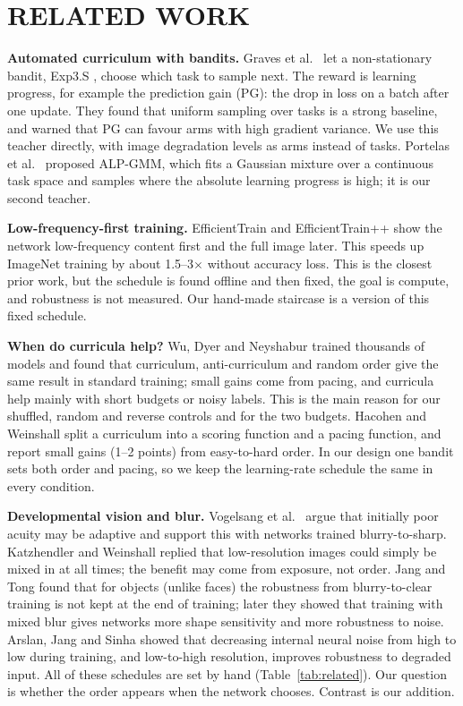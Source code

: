 \documentclass[a4paper,12pt]{report}
\begin{document}
\chapter{RELATED WORK}

\textbf{Automated curriculum with bandits.} Graves et al.\ \cite{graves2017} let a non-stationary bandit, Exp3.S \cite{auer2002}, choose which task to sample next. The reward is learning progress, for example the prediction gain (PG): the drop in loss on a batch after one update. They found that uniform sampling over tasks is a strong baseline, and warned that PG can favour arms with high gradient variance. We use this teacher directly, with image degradation levels as arms instead of tasks. Portelas et al.\ \cite{portelas2019} proposed ALP-GMM, which fits a Gaussian mixture over a continuous task space and samples where the absolute learning progress is high; it is our second teacher.

\textbf{Low-frequency-first training.} EfficientTrain \cite{wang2023efficienttrain} and EfficientTrain++ \cite{wang2024efficienttrainpp} show the network low-frequency content first and the full image later. This speeds up ImageNet training by about 1.5--3$\times$ without accuracy loss. This is the closest prior work, but the schedule is found offline and then fixed, the goal is compute, and robustness is not measured. Our hand-made staircase is a version of this fixed schedule.

\textbf{When do curricula help?} Wu, Dyer and Neyshabur \cite{wu2021curricula} trained thousands of models and found that curriculum, anti-curriculum and random order give the same result in standard training; small gains come from pacing, and curricula help mainly with short budgets or noisy labels. This is the main reason for our shuffled, random and reverse controls and for the two budgets. Hacohen and Weinshall \cite{hacohen2019} split a curriculum into a scoring function and a pacing function, and report small gains (1--2 points) from easy-to-hard order. In our design one bandit sets both order and pacing, so we keep the learning-rate schedule the same in every condition.

\textbf{Developmental vision and blur.} Vogelsang et al.\ \cite{vogelsang2018} argue that initially poor acuity may be adaptive and support this with networks trained blurry-to-sharp. Katzhendler and Weinshall \cite{katzhendler2019} replied that low-resolution images could simply be mixed in at all times; the benefit may come from exposure, not order. Jang and Tong \cite{jang2021blurry} found that for objects (unlike faces) the robustness from blurry-to-clear training is not kept at the end of training; later \cite{jang2024blur} they showed that training with mixed blur gives networks more shape sensitivity and more robustness to noise. Arslan, Jang and Sinha \cite{arslan2024noise} showed that decreasing internal neural noise from high to low during training, and low-to-high resolution, improves robustness to degraded input. All of these schedules are set by hand (Table~\ref{tab:related}). Our question is whether the order appears when the network chooses. Contrast is our addition.
\end{document}
